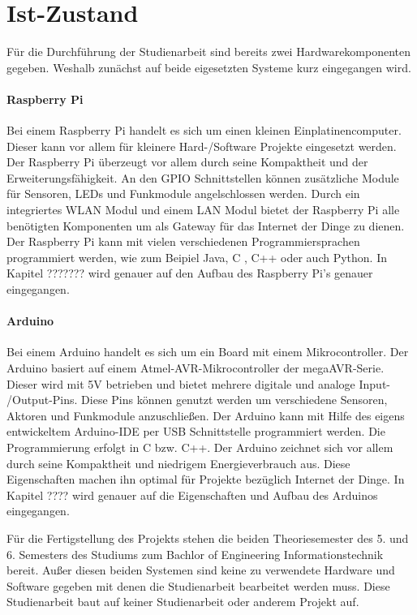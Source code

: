 \section{Ist-Zustand}
Für die Durchführung der Studienarbeit sind bereits zwei Hardwarekomponenten gegeben. Weshalb zunächst auf beide eigesetzten Systeme kurz eingegangen wird.
\paragraph{Raspberry Pi} 
Bei einem Raspberry Pi handelt es sich um einen kleinen Einplatinencomputer. Dieser kann vor allem für kleinere Hard-/Software Projekte eingesetzt werden. Der Raspberry Pi überzeugt vor allem durch  seine Kompaktheit und der Erweiterungsfähigkeit. An den GPIO Schnittstellen können zusätzliche Module für Sensoren, LEDs und Funkmodule angelschlossen werden.  Durch ein integriertes WLAN Modul und einem LAN Modul bietet der Raspberry Pi alle benötigten Komponenten um als Gateway für das Internet der Dinge zu dienen. Der Raspberry Pi kann mit vielen verschiedenen Programmiersprachen programmiert werden, wie zum Beipiel Java, C , C++ oder auch Python. In Kapitel ??????? wird genauer auf den Aufbau des Raspberry Pi’s genauer eingegangen.
\paragraph{Arduino} 
Bei einem Arduino handelt es sich um ein Board mit einem Mikrocontroller. Der Arduino basiert auf einem Atmel-AVR-Mikrocontroller der megaAVR-Serie. Dieser wird mit 5V betrieben und bietet mehrere digitale und analoge  Input- /Output-Pins.  Diese Pins können genutzt werden um verschiedene Sensoren, Aktoren und Funkmodule anzuschließen. Der Arduino kann mit Hilfe des eigens entwickeltem Arduino-IDE per USB Schnittstelle programmiert werden. Die Programmierung erfolgt in C bzw. C++. Der Arduino zeichnet sich vor allem durch seine Kompaktheit und niedrigem Energieverbrauch aus. Diese Eigenschaften machen ihn optimal für Projekte bezüglich Internet der Dinge. In Kapitel ???? wird genauer auf die Eigenschaften und Aufbau des Arduinos eingegangen.

Für die Fertigstellung des Projekts stehen die beiden Theoriesemester des 5. und 6. Semesters des Studiums zum Bachlor of Engineering Informationstechnik bereit. Außer diesen beiden Systemen sind keine zu verwendete Hardware und Software gegeben mit denen die Studienarbeit bearbeitet werden muss. Diese Studienarbeit baut auf keiner Studienarbeit oder anderem Projekt auf.

